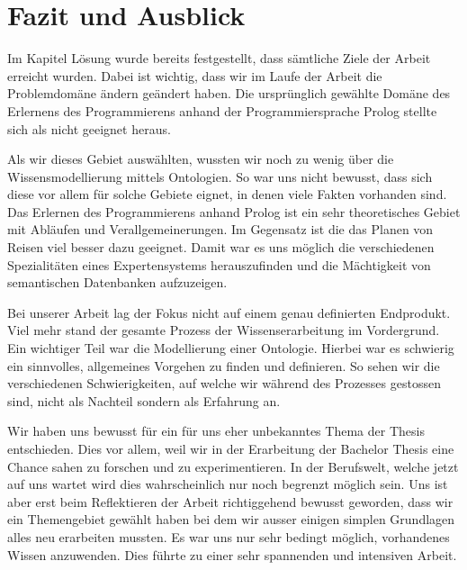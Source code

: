 \chapter{Fazit und Ausblick}
\label{chap:fazit}


Im Kapitel Lösung wurde bereits festgestellt, dass sämtliche Ziele der Arbeit erreicht wurden. Dabei ist wichtig, dass wir im Laufe der Arbeit die Problemdomäne ändern geändert haben. Die ursprünglich gewählte Domäne des Erlernens des Programmierens anhand der Programmiersprache Prolog stellte sich als nicht geeignet heraus.

Als wir dieses Gebiet auswählten, wussten wir noch zu wenig über die Wissensmodellierung mittels Ontologien. So war uns nicht bewusst, dass sich diese vor allem für solche Gebiete eignet, in denen viele Fakten vorhanden sind. Das Erlernen des Programmierens anhand Prolog ist ein sehr theoretisches Gebiet mit Abläufen und Verallgemeinerungen. Im Gegensatz ist die das Planen von Reisen viel besser dazu geeignet. Damit war es uns möglich die verschiedenen Spezialitäten eines Expertensystems herauszufinden und die Mächtigkeit von semantischen Datenbanken aufzuzeigen.

Bei unserer Arbeit lag der Fokus nicht auf einem genau definierten Endprodukt. Viel mehr stand der gesamte Prozess der Wissenserarbeitung im Vordergrund. Ein wichtiger Teil war die Modellierung einer Ontologie. Hierbei war es schwierig ein sinnvolles, allgemeines Vorgehen zu finden und definieren. So sehen wir die verschiedenen Schwierigkeiten, auf welche wir während des Prozesses gestossen sind, nicht als Nachteil sondern als Erfahrung an.

Wir haben uns bewusst für ein für uns eher unbekanntes Thema der Thesis entschieden. Dies vor allem, weil wir in der Erarbeitung der Bachelor Thesis eine Chance sahen zu forschen und zu experimentieren. In der Berufswelt, welche jetzt auf uns wartet wird dies wahrscheinlich nur noch begrenzt möglich sein. Uns ist aber erst beim Reflektieren der Arbeit richtiggehend bewusst geworden, dass wir ein Themengebiet gewählt haben bei dem wir ausser einigen simplen Grundlagen alles neu erarbeiten mussten. Es war uns nur sehr bedingt möglich, vorhandenes Wissen anzuwenden. Dies führte zu einer sehr spannenden und intensiven Arbeit.

